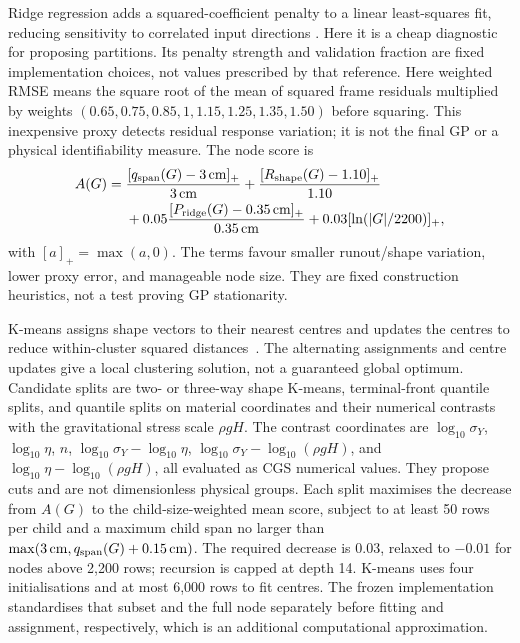 Ridge regression adds a squared-coefficient penalty to a linear
least-squares fit, reducing sensitivity to correlated input directions
\cite{hoerl1970ridge}. Here it is a cheap diagnostic for proposing
partitions. Its penalty strength and validation fraction are fixed
implementation choices, not values prescribed by that reference.
Here weighted RMSE means the square root of the mean of squared
frame residuals multiplied by weights
$(0.65,0.75,0.85,1,1.15,1.25,1.35,1.50)$ before squaring.
This inexpensive proxy detects residual response variation; it is not
the final GP or a physical identifiability measure. The node score is
\begin{equation}
\label{eq:partition-score}
\begin{aligned}
 A(G)={}&\frac{[q_{\rm span}(G)-3\,\mathrm{cm}]_+}{3\,\mathrm{cm}}
 +\frac{[R_{\rm shape}(G)-1.10]_+}{1.10}\\
 &+0.05\frac{[P_{\rm ridge}(G)-0.35\,\mathrm{cm}]_+}{0.35\,\mathrm{cm}}
 +0.03[\ln(|G|/2200)]_+,
\end{aligned}
\end{equation}
with $[a]_+=\max(a,0)$. The terms favour smaller runout/shape variation,
lower proxy error, and manageable node size. They are fixed construction
heuristics, not a test proving GP stationarity.

K-means assigns shape vectors to their nearest centres and updates the
centres to reduce within-cluster squared distances~\cite{lloyd1982least}.
The alternating assignments and centre updates give a local clustering
solution, not a guaranteed global optimum. Candidate splits
are two- or three-way shape K-means, terminal-front
quantile splits, and quantile splits on material coordinates and their
numerical contrasts with the gravitational stress scale $\rho gH$.
The contrast coordinates are $\log_{10}\sigma_Y$, $\log_{10}\eta$, $n$,
$\log_{10}\sigma_Y-\log_{10}\eta$,
$\log_{10}\sigma_Y-\log_{10}(\rho gH)$, and
$\log_{10}\eta-\log_{10}(\rho gH)$, all evaluated as CGS numerical
values. They propose cuts and are not dimensionless physical groups.
Each split maximises the decrease from $A(G)$ to the child-size-weighted
mean score, subject to at least 50 rows per child and a maximum child
span no larger than $\max(3\,\mathrm{cm},q_{\rm span}(G)+0.15\,\mathrm{cm})$.
The required decrease is $0.03$, relaxed to $-0.01$ for nodes above
2,200 rows; recursion is capped at depth 14.
K-means uses four initialisations and at most 6,000 rows to fit centres.
The frozen implementation standardises that subset and the full node
separately before fitting and assignment, respectively, which is an
additional computational approximation.

